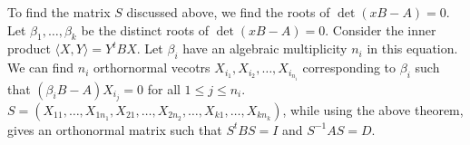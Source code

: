 \documentclass[15pt,a4paper]{book}
\theoremstyle{definition}
\newcommand{\ip}[1]{\langle #1 \rangle}
\begin{document}
To find the matrix $S$ discussed above, we find the roots of $\det (xB-A) = 0$. Let $\beta_{1},\ldots,\beta_{k}$ be the distinct roots of $\det (xB-A) = 0$. Consider the inner product $\ip{X,Y} = Y^{t}BX$. Let $\beta_{i}$ have an algebraic multiplicity $n_{i}$ in this equation. We can find $n_{i}$ orthornormal vecotrs $X_{i_{1}},X_{i_{2}},\ldots,X_{i_{n_{i}}}$ corresponding to $\beta_{i}$ such that $(\beta_{i}B-A)X_{i_{j}} = 0$ for all $1 \leq j \leq n_{i}$. $S = (X_{11},\ldots,X_{1n_{1}},X_{21},\ldots,X_{2n_{2}},\ldots,X_{k1},\ldots,X_{kn_{k}})$, while using the above theorem, gives an orthonormal matrix such that $S^{t}BS = I$ and $S^{-1}AS = D$.



\end{document}
